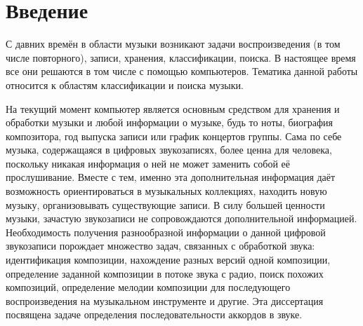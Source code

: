 \chapter*{Введение}							%


С давних времён в области музыки возникают задачи воспроизведения (в том числе
повторного), записи, хранения, классификации, поиска. В настоящее время все они
решаются в том числе с помощью компьютеров. Тематика данной работы относится к
областям классификации и поиска музыки.

На текущий момент компьютер является основным средством для хранения и обработки
музыки и любой информации о музыке, будь то ноты, биография композитора, год
выпуска записи или график концертов группы. Сама по себе музыка, содержащаяся в
цифровых звукозаписях, более ценна для человека, поскольку никакая
информация о ней не может заменить собой её прослушивание. Вместе с тем, именно
эта дополнительная информация даёт возможность ориентироваться в музыкальных
коллекциях, находить новую музыку, организовывать существующие записи. В силу
большей ценности музыки, зачастую звукозаписи не сопровождаются дополнительной
информацией. Необходимость получения разнообразной информации о данной цифровой
звукозаписи порождает множество задач, связанных с обработкой звука:
идентификация композиции, нахождение разных версий одной композиции, определение
заданной композиции в потоке звука с радио, поиск похожих композиций,
определение мелодии композиции для последующего воспроизведения на музыкальном
инструменте и другие. Эта диссертация посвящена задаче определения
последовательности аккордов в звуке.

